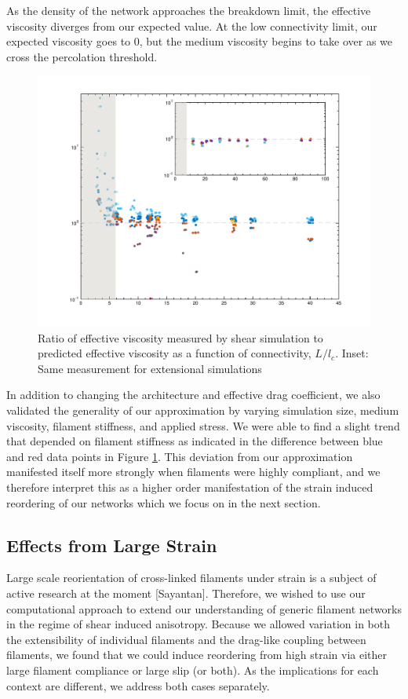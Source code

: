 \documentclass[pre,reprint]{revtex4-1}
\begin{document}
As the density of the network approaches the breakdown limit, the effective viscosity diverges from our expected value.  At the low connectivity limit, our expected viscosity goes to 0, but the medium viscosity begins to take over as we cross the percolation threshold.  
\begin{figure}[h!]
\centering
\includegraphics[width=\hsize]{eff_vic_master}
\caption{\label{fig:effvic}Ratio of effective viscosity measured by shear simulation to predicted effective viscosity as a function of connectivity, $L/l_c$. Inset: Same measurement for extensional simulations }
\end{figure}

In addition to changing the architecture and effective drag coefficient, we also validated the generality of our approximation by varying simulation size, medium viscosity, filament stiffness, and applied stress.  We were able to find a slight trend that depended on filament stiffness as indicated in the difference between blue and red data points in Figure \ref{fig:effvic}.  This deviation from our approximation manifested itself more strongly when filaments were highly compliant, and we therefore interpret this as a higher order manifestation of the strain induced reordering of our networks which we focus on in the next section.



\subsection{Effects from Large Strain}

Large scale reorientation of cross-linked filaments under strain is a subject of active research at the moment [Sayantan].  Therefore, we wished to use our computational approach to extend our understanding of generic filament networks in the regime of shear induced anisotropy.  Because we allowed variation in both the extensibility of individual filaments and the drag-like coupling between filaments, we found that we could induce reordering from high strain via either large filament compliance or large slip (or both).  As the implications for each context are different, we address both cases separately.
\end{document}
